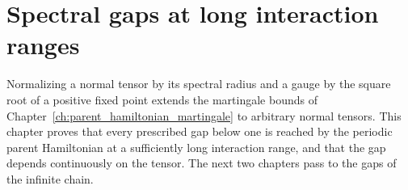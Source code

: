 \chapter{Spectral gaps at long interaction ranges}
\label{ch:parent_hamiltonian_long_range_gaps}

Normalizing a normal tensor by its spectral radius and a gauge by the square
root of a positive fixed point extends the martingale bounds of
Chapter~\ref{ch:parent_hamiltonian_martingale} to arbitrary normal tensors.
This chapter proves that every prescribed gap below one is reached by the
periodic parent Hamiltonian at a sufficiently long interaction range, and that
the gap depends continuously on the tensor.
The next two chapters pass to the gaps of the infinite chain.



